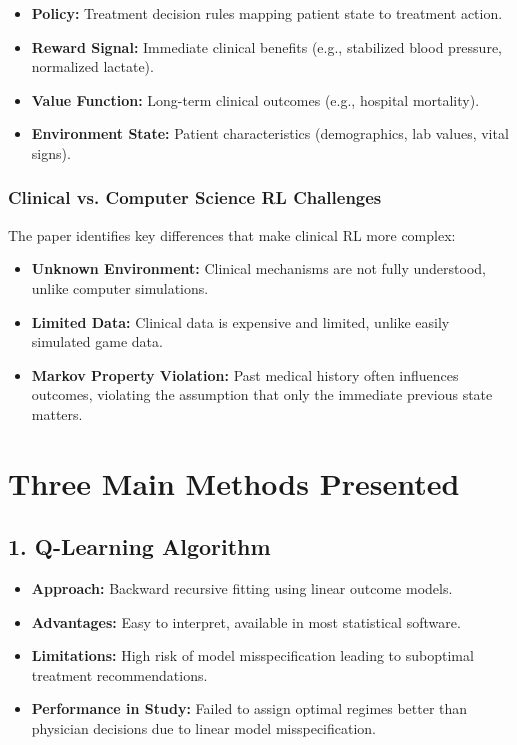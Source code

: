 \begin{itemize}
    \item \textbf{Policy:} Treatment decision rules mapping patient state to treatment action.
    \item \textbf{Reward Signal:} Immediate clinical benefits (e.g., stabilized blood pressure, normalized lactate).
    \item \textbf{Value Function:} Long-term clinical outcomes (e.g., hospital mortality).
    \item \textbf{Environment State:} Patient characteristics (demographics, lab values, vital signs).
\end{itemize}

\subsubsection*{Clinical vs. Computer Science RL Challenges}
The paper identifies key differences that make clinical RL more complex:
\begin{itemize}
    \item \textbf{Unknown Environment:} Clinical mechanisms are not fully understood, unlike computer simulations.
    \item \textbf{Limited Data:} Clinical data is expensive and limited, unlike easily simulated game data.
    \item \textbf{Markov Property Violation:} Past medical history often influences outcomes, violating the assumption that only the immediate previous state matters.
\end{itemize}

\section*{Three Main Methods Presented}

\subsection*{1. Q-Learning Algorithm}
\begin{itemize}
    \item \textbf{Approach:} Backward recursive fitting using linear outcome models.
    \item \textbf{Advantages:} Easy to interpret, available in most statistical software.
    \item \textbf{Limitations:} High risk of model misspecification leading to suboptimal treatment recommendations.
    \item \textbf{Performance in Study:} Failed to assign optimal regimes better than physician decisions due to linear model misspecification.
\end{itemize}

